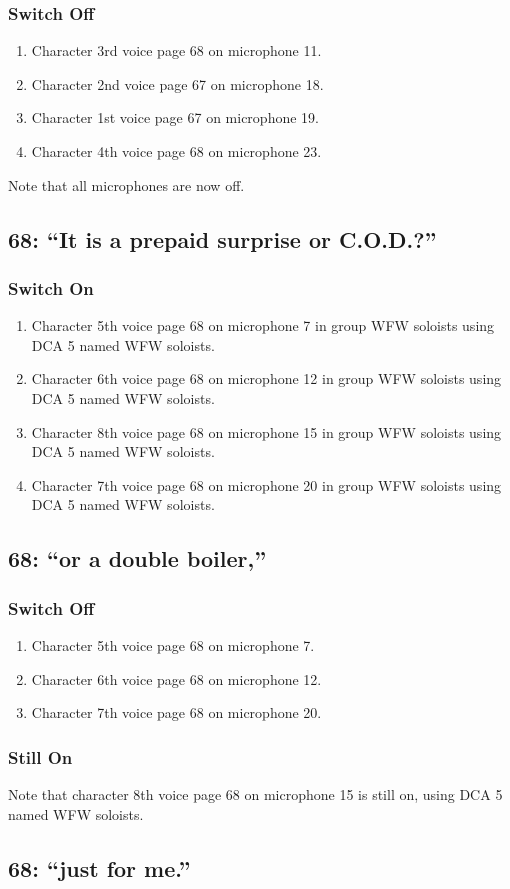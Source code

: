 \subsubsection* {Switch Off}
\begin{enumerate}
\item Character 3rd voice page 68 on microphone 11.
\item Character 2nd voice page 67 on microphone 18.
\item Character 1st voice page 67 on microphone 19.
\item Character 4th voice page 68 on microphone 23.
\end{enumerate}
Note that all microphones are now off.
\subsection* {68: ``It is a prepaid surprise or C.O.D.?''}
\subsubsection* {Switch On}
\begin{enumerate}
\item Character 5th voice page 68 on microphone 7 in group WFW soloists using DCA 5 named WFW soloists.
\item Character 6th voice page 68 on microphone 12 in group WFW soloists using DCA 5 named WFW soloists.
\item Character 8th voice page 68 on microphone 15 in group WFW soloists using DCA 5 named WFW soloists.
\item Character 7th voice page 68 on microphone 20 in group WFW soloists using DCA 5 named WFW soloists.
\end{enumerate}
\subsection* {68: ``or a double boiler,''}
\subsubsection* {Switch Off}
\begin{enumerate}
\item Character 5th voice page 68 on microphone 7.
\item Character 6th voice page 68 on microphone 12.
\item Character 7th voice page 68 on microphone 20.
\end{enumerate}
\subsubsection* {Still On}
Note that character 8th voice page 68 on microphone 15 is still on, using DCA 5 named WFW soloists.\subsection* {68: ``just for me.''}
